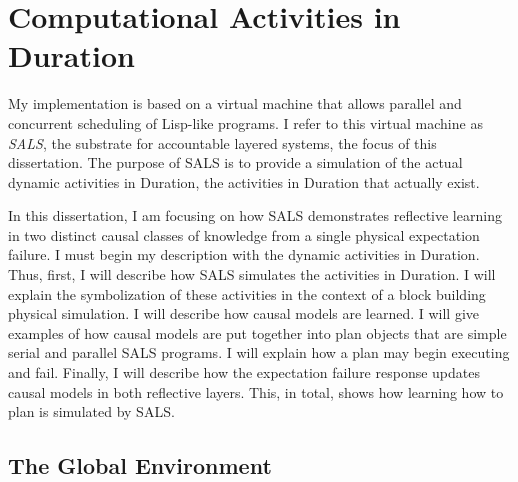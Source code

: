 \chapter{Computational Activities in Duration}
\label{chapter:computational_activities_in_duration}


My implementation is based on a virtual machine that allows parallel
and concurrent scheduling of Lisp-like programs.  I refer to this
virtual machine as \emph{SALS}, the substrate for accountable layered
systems, the focus of this dissertation.  The purpose of SALS is to
provide a simulation of the actual dynamic activities in Duration, the
activities in Duration that actually exist.


In this dissertation, I am focusing on how SALS demonstrates
reflective learning in two distinct causal classes of knowledge from a
single physical expectation failure.  I must begin my description with
the dynamic activities in Duration.  Thus, first, I will describe how
SALS simulates the activities in Duration.  I will explain the
symbolization of these activities in the context of a block building
physical simulation.  I will describe how causal models are learned.
I will give examples of how causal models are put together into plan
objects that are simple serial and parallel SALS programs.  I will
explain how a plan may begin executing and fail.  Finally, I will
describe how the expectation failure response updates causal models in
both reflective layers.  This, in total, shows how learning how to
plan is simulated by SALS.

\section{The Global Environment}


